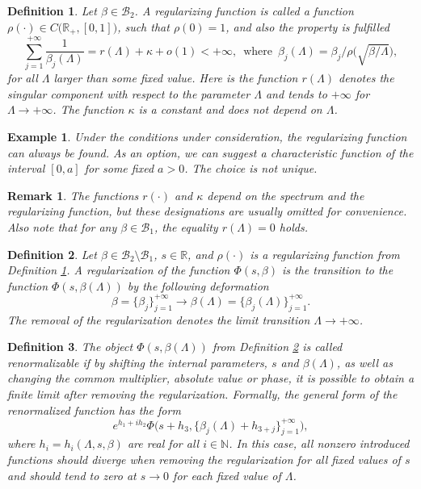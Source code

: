 \documentclass[a4paper]{article}
\newtheorem{deff}{Definition}
\newtheorem{remark}{Remark}
\newtheorem{exm}{Example}
\begin{document}
\begin{deff}\label{34-d-3}
Let $\beta\in\mathcal{B}_2$.
A regularizing function is called a function $\rho(\cdot)\in C\big(\mathbb{R}_+,[0,1]\big)$, such that $\rho(0)=1$, and also the property is fulfilled
\begin{equation}\label{34-13}
\sum_{j=1}^{+\infty}\frac{1}{\beta_j(\Lambda)}=r(\Lambda)+\kappa+o(1)<+\infty,
\,\,\,
\mbox{where}\,\,\,\beta_j(\Lambda)=\beta_j\big/\rho\big(\sqrt{\beta/\Lambda}\big),
\end{equation}
for all $\Lambda$ larger than some fixed value. Here is the function $r(\Lambda)$ denotes the singular component with respect to the parameter $\Lambda$ and tends to $+\infty$ for $\Lambda\to+\infty$. The function $\kappa$ is a constant and does not depend on $\Lambda$.
\end{deff}
\begin{exm}\label{34-e-8}
Under the conditions under consideration, the regularizing function can always be found. As an option, we can suggest a characteristic function of the interval $[0,a]$ for some fixed $a>0$. The choice is not unique.
\end{exm}
\begin{remark}\label{34-r-2}
The functions $r(\cdot)$ and $\kappa$ depend on the spectrum and the regularizing function, but these designations are usually omitted for convenience. Also note that for any $\beta\in\mathcal{B}_1$, the equality $r(\Lambda)=0$ holds. %
\end{remark}
\begin{deff}\label{34-d-4}
Let $\beta\in\mathcal{B}_2\setminus\mathcal{B}_1$, $s\in\mathbb{R}$, and $\rho(\cdot)$ is a regularizing function from Definition \ref{34-d-3}. A regularization of the function $\Phi(s,\beta)$ is the transition to the function $\Phi(s,\beta(\Lambda))$ by the following deformation $$\beta=\{\beta_j\}_{j=1}^{+\infty}\to\beta(\Lambda)=\{\beta_j(\Lambda)\}_{j=1}^{+\infty}.$$
The removal of the regularization denotes the limit transition $\Lambda\to+\infty$.
\end{deff}
\begin{deff}\label{34-d-5}
The object $\Phi(s,\beta(\Lambda))$ from Definition \ref{34-d-4} is called renormalizable if by shifting the internal parameters, $s$ and $\beta(\Lambda)$, as well as changing the common multiplier, absolute value or phase, it is possible to obtain a finite limit after removing the regularization. Formally, the general form of the renormalized function has the form
\begin{equation*}
e^{h_1+ih_2}
\Phi\big(s+h_3,\{\beta_j(\Lambda)+h_{3+j}\}_{j=1}^{+\infty}\big),
\end{equation*}
where $h_i=h_i(\Lambda,s,\beta)$ are real for all $i\in\mathbb{N}$. In this case, all nonzero introduced functions should diverge when removing the regularization for all fixed values of $s$ and should tend to zero at $s\to0$ for each fixed value of $\Lambda$.
\end{deff}
\end{document}
